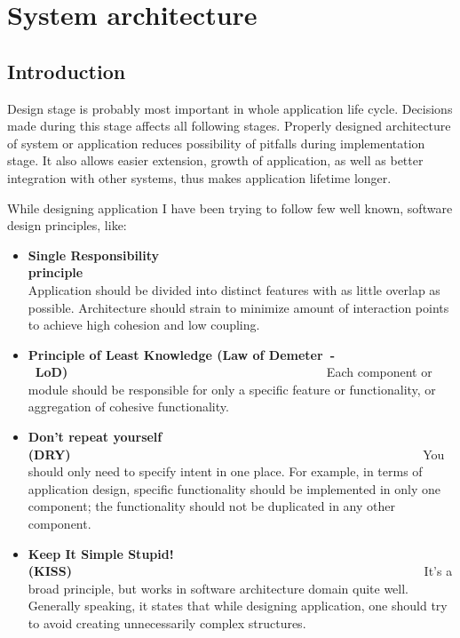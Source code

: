 %


\chapter{System architecture}
\label{cha:sys_arch}


\section{Introduction}
\label{sec:gui}

Design stage is probably most important in whole application life cycle. Decisions made during this stage affects 
all following stages. Properly designed architecture of system or application reduces possibility of pitfalls during
implementation stage. It also allows easier extension, growth of application, as well as better integration with other
systems, thus makes application lifetime longer. 

While designing application I have been trying to follow few well known, software design principles, like:
\begin{itemize}
 \item {\bf Single Responsibility
principle}~~~~~~~~~~~~~~~~~~~~~~~~~~~~~~~~~~~~~~~~~~~~~~~~~~~~~~~~\linebreak
Application should be divided into distinct features with as
little overlap as possible. Architecture should strain to minimize amount of interaction points to achieve high cohesion
and low coupling.
 \item {\bf Principle of Least Knowledge (Law of Demeter~-~LoD)}~~~~~~~~~~~~~~~~~~~~~~~~~~~~~~~~~~~~~~~~~\linebreak
Each component or module should be responsible for only a specific feature or functionality, or aggregation of cohesive
functionality.
 \item {\bf Don't repeat yourself (DRY)}~~~~~~~~~~~~~~~~~~~~~~~~~~~~~~~~~~~~~~~~~~~~~~~~~~~~~~~~\linebreak
You should only need to specify intent in one place. For example, in terms of application design, specific functionality
should be implemented in only one component; the functionality should not be duplicated in any other component.
 \item {\bf Keep It Simple Stupid! (KISS)}~~~~~~~~~~~~~~~~~~~~~~~~~~~~~~~~~~~~~~~~~~~~~~~~~~~~~~~~\linebreak
It's a broad principle, but works in software architecture domain quite well. Generally speaking, it states that while
designing application, one should try to avoid creating unnecessarily complex structures.
\end{itemize}

